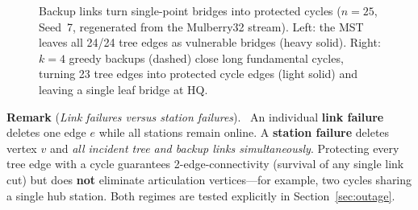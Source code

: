 \documentclass[10pt,a4paper]{article}
\newenvironment{keybox}[1]{\par\smallskip\noindent\textbf{Remark} (\textit{#1}).\ \ignorespaces}{\par\smallskip}
\begin{document}
\begin{figure}[t]
\centering
{}
\caption{Backup links turn single-point bridges into protected cycles ($n=25$, Seed~7, regenerated from the
Mulberry32 stream). Left: the MST leaves all 24/24 tree edges as vulnerable bridges (heavy solid). Right: $k=4$ greedy
backups (dashed) close long fundamental cycles, turning 23 tree edges into protected cycle edges (light solid) and leaving a
single leaf bridge at HQ.}
\label{fig:bridges}
\end{figure}

\begin{keybox}{Link failures versus station failures}
An individual \textbf{link failure} deletes one edge $e$ while all stations remain online. A \textbf{station failure}
deletes vertex $v$ and \emph{all incident tree and backup links simultaneously}. Protecting every tree edge with a cycle
guarantees 2-edge-connectivity (survival of any single link cut) but does \textbf{not} eliminate articulation vertices---for
example, two cycles sharing a single hub station. Both regimes are tested explicitly in Section~\ref{sec:outage}.
\end{keybox}

\end{document}
